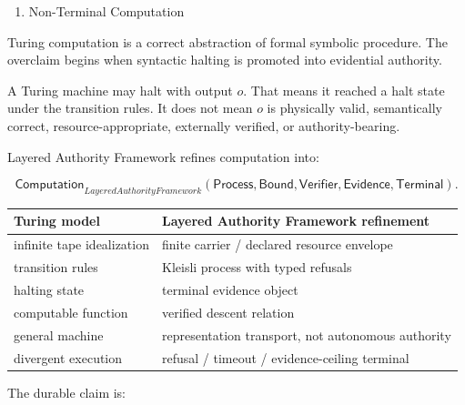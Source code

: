 \documentclass[
  10pt,
]{article}
\providecommand{\tightlist}{%
  \setlength{\itemsep}{0pt}\setlength{\parskip}{0pt}}
\providecommand{\tightlist}{%
  \setlength{\itemsep}{0pt}\setlength{\parskip}{0pt}}
\begin{document}
\begin{enumerate}
\def\labelenumi{\arabic{enumi}.}
\setcounter{enumi}{12}
\tightlist
\item
  Non-Terminal Computation
\end{enumerate}

Turing computation is a correct abstraction of formal symbolic procedure. The overclaim begins when syntactic halting is promoted into evidential authority.

A Turing machine may halt with output \protect\hypertarget{math-E0155-0209}{}{\(o\)}. That means it reached a halt state under the transition rules. It does not mean \protect\hypertarget{math-E0155-0210}{}{\(o\)} is physically valid, semantically correct, resource-appropriate, externally verified, or authority-bearing.

Layered Authority Framework refines computation into:

\protect\hypertarget{math-E0156-0211}{}{\[
\boxed{
\mathsf{Computation}_{Layered Authority Framework}
(\mathsf{Process},\mathsf{Bound},\mathsf{Verifier},\mathsf{Evidence},\mathsf{Terminal}).
}
\]}

\begin{longtable}[]{@{}
  >{\raggedright\arraybackslash}p{}
  >{\raggedright\arraybackslash}p{}@{}}
\toprule\noalign{}
\begin{minipage}[b]{\linewidth}\raggedright
Turing model
\end{minipage} & \begin{minipage}[b]{\linewidth}\raggedright
Layered Authority Framework refinement
\end{minipage} \\
\midrule\noalign{}
\endhead
\bottomrule\noalign{}
\endlastfoot
infinite tape idealization & finite carrier / declared resource envelope \\
transition rules & Kleisli process with typed refusals \\
halting state & terminal evidence object \\
computable function & verified descent relation \\
general machine & representation transport, not autonomous authority \\
divergent execution & refusal / timeout / evidence-ceiling terminal \\
\end{longtable}

The durable claim is:
\end{document}
